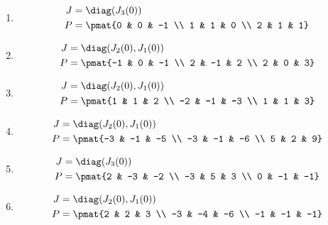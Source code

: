 \begin{enumerate}
\item

\begin{align*}
J &= \diag(J_{3}(0))\\
P &= \pmat{0 & 0 & -1 \\ 1 & 1 & 0 \\ 2 & 1 & 1}
\end{align*}

\item

\begin{align*}
J &= \diag(J_{2}(0), J_{1}(0))\\
P &= \pmat{-1 & 0 & -1 \\ 2 & -1 & 2 \\ 2 & 0 & 3}
\end{align*}

\item

\begin{align*}
J &= \diag(J_{2}(0), J_{1}(0))\\
P &= \pmat{1 & 1 & 2 \\ -2 & -1 & -3 \\ 1 & 1 & 3}
\end{align*}

\item

\begin{align*}
J &= \diag(J_{2}(0), J_{1}(0))\\
P &= \pmat{-3 & -1 & -5 \\ -3 & -1 & -6 \\ 5 & 2 & 9}
\end{align*}

\item

\begin{align*}
J &= \diag(J_{3}(0))\\
P &= \pmat{2 & -3 & -2 \\ -3 & 5 & 3 \\ 0 & -1 & -1}
\end{align*}

\item

\begin{align*}
J &= \diag(J_{2}(0), J_{1}(0))\\
P &= \pmat{2 & 2 & 3 \\ -3 & -4 & -6 \\ -1 & -1 & -1}
\end{align*}


\end{enumerate}
